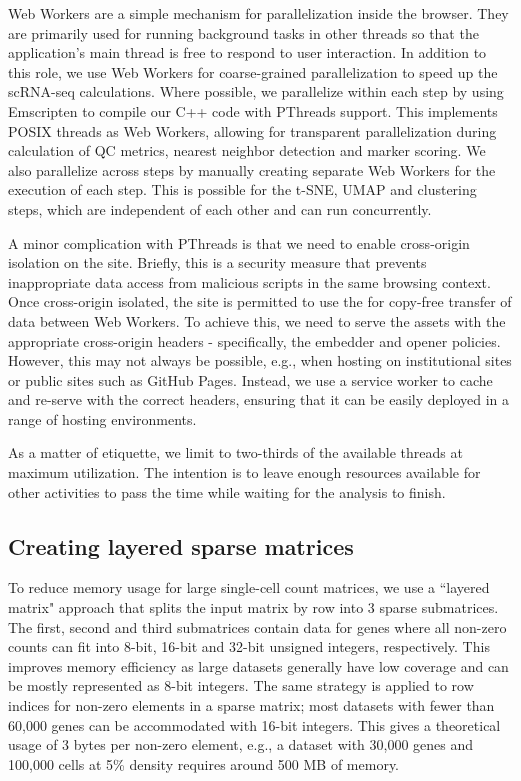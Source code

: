\documentclass{article}
\begin{document}
Web Workers are a simple mechanism for parallelization inside the browser.
They are primarily used for running background tasks in other threads so that the application's main thread is free to respond to user interaction.
In addition to this role, we use Web Workers for coarse-grained parallelization to speed up the scRNA-seq calculations.
Where possible, we parallelize within each step by using Emscripten to compile our C++ code with PThreads support.
This implements POSIX threads as Web Workers, allowing for transparent parallelization during calculation of QC metrics, nearest neighbor detection and marker scoring.
We also parallelize across steps by manually creating separate Web Workers for the execution of each step.
This is possible for the t-SNE, UMAP and clustering steps, which are independent of each other and can run concurrently.

A minor complication with PThreads is that we need to enable cross-origin isolation on the  site.
Briefly, this is a security measure that prevents inappropriate data access from malicious scripts in the same browsing context.
Once cross-origin isolated, the site is permitted to use the  for copy-free transfer of data between Web Workers.
To achieve this, we need to serve the  assets with the appropriate cross-origin headers - specifically, the embedder and opener policies.
However, this may not always be possible, e.g., when hosting on institutional sites or public sites such as GitHub Pages.
Instead, we use a service worker to cache and re-serve  with the correct headers,
ensuring that it can be easily deployed in a range of hosting environments.

As a matter of etiquette, we limit  to two-thirds of the available threads at maximum utilization.
The intention is to leave enough resources available for other activities to pass the time while waiting for the analysis to finish.

\subsection{Creating layered sparse matrices}

To reduce memory usage for large single-cell count matrices, we use a ``layered matrix" approach that splits the input matrix by row into 3 sparse submatrices.
The first, second and third submatrices contain data for genes where all non-zero counts can fit into 8-bit, 16-bit and 32-bit unsigned integers, respectively.
This improves memory efficiency as large datasets generally have low coverage and can be mostly represented as 8-bit integers.
The same strategy is applied to row indices for non-zero elements in a sparse matrix; most datasets with fewer than 60,000 genes can be accommodated with 16-bit integers.
This gives a theoretical usage of 3 bytes per non-zero element, e.g., a dataset with 30,000 genes and 100,000 cells at 5\% density requires around 500 MB of memory.
\end{document}
